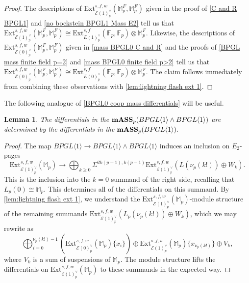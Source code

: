 \documentclass{amsart}
\newtheorem{lemma}[theorem]{Lemma}
\theoremstyle{plain}
\numberwithin{theorem}{section}
\numberwithin{equation}{section}
\numberwithin{figure}{section}
\newcommand{\mF}{{\mathbb F}}
\newcommand{\mM}{{\mathbb M}}
\newcommand{\0}{\langle 0 \rangle }
\begin{document}
\begin{proof}
The descriptions of $\text{Ext}_{\mathcal{E}(1)^\vee_p}^{s,f,w}(\mM_p^F, \mM_p^F)  $ given in the proof of \cref{C and R BPGL1} and \cref{no bockstein BPGL1 Mass E2} tell us that $\text{Ext}_{\mathcal{E}(1)^\vee_p}^{s,f,w}(\mM_p^F, \mM_p^F)  \cong \text{Ext}^{s,f}_{E(1)^\vee_p}(\mF_p, \mF_p) \otimes \mM_p^F$. Likewise, the descriptions of $\text{Ext}_{\mathcal{E}(0)^\vee_p}^{s,f,w}(\mM_p^F, \mM_p^F)  $ given in \cref{mass BPGL0 C and R} and the proofs of \cref{BPGL mass finite field p=2} and \cref{mass BPGL0 finite field p>2} tell us that $\text{Ext}_{\mathcal{E}(0)^\vee_p}^{s,f,w}(\mM_p^F, \mM_p^F)  \cong \text{Ext}^{s,f}_{E(0)^\vee_p}(\mF_p, \mF_p) \otimes \mM_p^F$. The claim follows immediately from combining these observations with \cref{lem:lightning flash ext 1}. 
\end{proof}


The following analogue of \cref{BPGL0 coop mass differentials} will be useful.
\begin{lemma}
\label{BPGL1 coop mass differentials}
    The differentials in the $\textup{\textbf{mASS}}_p(BPGL \langle 1 \rangle \wedge BPGL \langle 1 \rangle)$ are determined by the differentials in the $\textup{\textbf{mASS}}_p(BPGL \langle 1 \rangle).$
\end{lemma}
\begin{proof}
    The map $BPGL \langle 1 \rangle \to BPGL \langle1 \rangle \wedge BPGL \langle 1 \rangle$ induces an inclusion on $E_2$-pages
    \[\text{Ext}^{s,f,w}_{\mathcal{E}(1)_p^\vee}(\mathbb{M}_p) \to \bigoplus_{k \geq 0}\Sigma^{2k(p-1), k(p-1)}\text{Ext}^{s,f,w}_{\mathcal{E}(1)^\vee_p}(L(\nu_p(k!)) \oplus W_k).\]
    This is the inclusion into the $k=0$ summand of the right side, recalling that $L_p(0) \cong \mathbb{M}_p.$ This determines all of the differentials on this summand. By \cref{lem:lightning flash ext 1}, we understand the $\text{Ext}_{\mathcal{E}(1)^\vee_p}^{s,f,w}(\mathbb{M}_p)$-module structure of the remaining summands $\text{Ext}^{s,f,w}_{\mathcal{E}(1)^\vee_p}(L_p(\nu_p(k!)) \oplus W_k)$, which we may rewrite as
    \[ \bigoplus_{i =0}^{\nu_p(k!)-1}(\text{Ext}^{s,f,w}_{\mathcal{E}(0)_p^\vee}(\mathbb{M}_p)\{x_{i}\}) \oplus \text{Ext}^{s,f,w}_{\mathcal{E}(1)_p^\vee}(\mathbb{M}_p)\{x_{\nu_p(k!)}\} \oplus V_k,\]
    where $V_k$ is a sum of suspensions of $\mathbb{M}_p$. The module structure lifts the differentials on $\text{Ext}_{\mathcal{E}(1)^\vee_p}^{s,f,w}(\mathbb{M}_p)$ to these summands in the expected way.
\end{proof}
\end{document}
